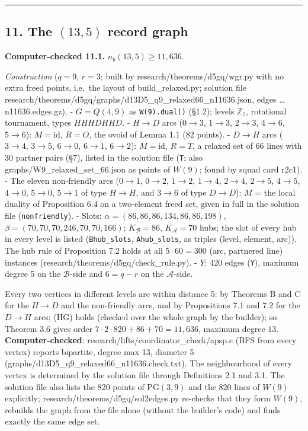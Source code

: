 \documentclass[
  11pt,
]{article}
\begin{document}
\begin{center}\rule{0.5\linewidth}{0.5pt}\end{center}

\hypertarget{the-135-record-graph}{%
\subsection{\texorpdfstring{11. The \((13,5)\) record
graph}{11. The (13,5) record graph}}\label{the-135-record-graph}}

\textbf{Computer-checked 11.1.} \(n_b(13,5)\ge 11{,}636\).

\emph{Construction} (\(q = 9\), \(r = 3\); built by
research/theorems/d5gq/wgr.py with no extra freed points, i.e.~the
layout of build\_relaxed.py; solution file
research/theorems/d5gq/graphs/d13D5\_q9\_relaxed66\_n11636.json, edges
\ldots n11636.edges.gz). - \(G = Q(4,9)\) as \texttt{W(9).dual()}
(§1.2); levels \(\mathbb Z_7\), rotational tournament, types
\(HHHDHHD\). - \(H\to D\) arcs (\(0\to3\), \(1\to3\), \(2\to3\),
\(4\to6\), \(5\to6\)): \(M = \mathrm{id}\), \(R = O\), the ovoid of
Lemma 1.1 (82 points). - \(D\to H\) arcs (\(3\to4\), \(3\to5\),
\(6\to0\), \(6\to1\), \(6\to2\)): \(M = \mathrm{id}\), \(R = T\), a
relaxed set of 66 lines with 30 partner pairs (§7), listed in the
solution file (\texttt{T}; also graphs/W9\_relaxed\_set\_66.json as
points of \(W(9)\); found by squad card r2c1). - The eleven non-friendly
arcs (\(0\to1\), \(0\to2\), \(1\to2\), \(1\to4\), \(2\to4\), \(2\to5\),
\(4\to5\), \(4\to0\), \(5\to0\), \(5\to1\) of type \(H\to H\), and
\(3\to6\) of type \(D\to D\)): \(M\) = the local duality of Proposition
6.4 on a two-element freed set, given in full in the solution file
(\texttt{nonfriendly}). - Slots: \(\alpha = (86,86,86,134,86,86,198)\),
\(\beta = (70,70,70,246,70,70,166)\); \(K_{\mathcal B} = 86\),
\(K_{\mathcal A} = 70\) hubs; the slot of every hub in every level is
listed (\texttt{Bhub\_slots}, \texttt{Ahub\_slots}, as triples (level,
element, arc)). The hub rule of Proposition 7.2 holds at all
\(5\cdot 60 = 300\) (arc, partnered line) instances
(research/theorems/d5gq/check\_rule.py). - \(Y\): 420 edges
(\texttt{Y}), maximum degree 5 on the \(\mathcal B\)-side and
\(6 = q-r\) on the \(\mathcal A\)-side.

Every two vertices in different levels are within distance 5: by
Theorems B and C for the \(H\to D\) and the non-friendly arcs, and by
Propositions 7.1 and 7.2 for the \(D\to H\) arcs; (HG) holds (checked
over the whole graph by the builder); so Theorem 3.6 gives order
\(7\cdot 2\cdot 820+86+70 = 11{,}636\), maximum degree \(13\).
\textbf{Computer-checked}: research/lifts/coordinator\_check/apsp.c (BFS
from every vertex) reports bipartite, degree max 13, diameter 5
(graphs/d13D5\_q9\_relaxed66\_n11636.check.txt). The neighbourhood of
every vertex is determined by the solution file through Definitions 2.1
and 3.1. The solution file also lists the 820 points of
\(\mathrm{PG}(3,9)\) and the 820 lines of \(W(9)\) explicitly;
research/theorems/d5gq/sol2edges.py re-checks that they form \(W(9)\),
rebuilds the graph from the file alone (without the builder's code) and
finds exactly the same edge set.
\end{document}
